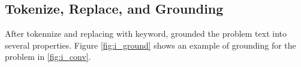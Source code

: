 \documentclass[document.tex]{subfiles}
\begin{document}
\subsection{Tokenize, Replace, and Grounding}
After tokennize and replacing with keyword, grounded the problem text into several properties. Figure \ref{fig:i_ground} shows an example of grounding for the problem in \ref{fig:i_conv}.
\begin{figure}[H]
\end{figure}
\end{document}

